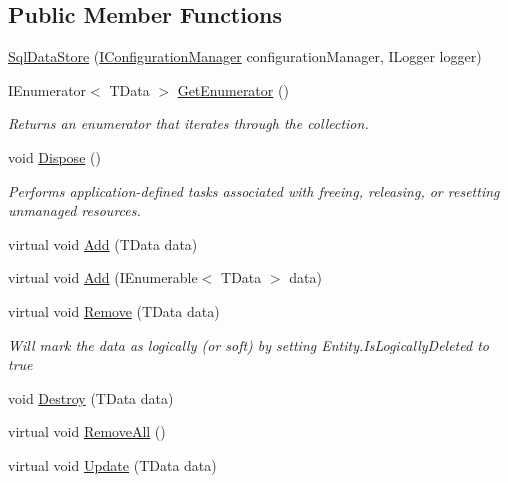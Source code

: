\subsection*{Public Member Functions}
\begin{DoxyCompactItemize}
\item 
\hyperlink{classCqrs_1_1DataStores_1_1SqlDataStore_a0ce9b3f74799e463d4f53eda386d5577}{Sql\+Data\+Store} (\hyperlink{interfaceCqrs_1_1Configuration_1_1IConfigurationManager}{I\+Configuration\+Manager} configuration\+Manager, I\+Logger logger)
\item 
I\+Enumerator$<$ T\+Data $>$ \hyperlink{classCqrs_1_1DataStores_1_1SqlDataStore_a774a0a12d6a89479cf25191916f51c47}{Get\+Enumerator} ()
\begin{DoxyCompactList}\small\item\em Returns an enumerator that iterates through the collection. \end{DoxyCompactList}\item 
void \hyperlink{classCqrs_1_1DataStores_1_1SqlDataStore_a975c0087677987dffccc4f0ffa97e691}{Dispose} ()
\begin{DoxyCompactList}\small\item\em Performs application-\/defined tasks associated with freeing, releasing, or resetting unmanaged resources. \end{DoxyCompactList}\item 
virtual void \hyperlink{classCqrs_1_1DataStores_1_1SqlDataStore_abcca53d2e93dbdfb193a9fb0996849c5}{Add} (T\+Data data)
\item 
virtual void \hyperlink{classCqrs_1_1DataStores_1_1SqlDataStore_a45aa105f2571510223c6073804690487}{Add} (I\+Enumerable$<$ T\+Data $>$ data)
\item 
virtual void \hyperlink{classCqrs_1_1DataStores_1_1SqlDataStore_a898d15db199f054865a96ac646bf54fb}{Remove} (T\+Data data)
\begin{DoxyCompactList}\small\item\em Will mark the {\itshape data}  as logically (or soft) by setting Entity.\+Is\+Logically\+Deleted to true \end{DoxyCompactList}\item 
void \hyperlink{classCqrs_1_1DataStores_1_1SqlDataStore_a5ec396c9eb202c8de931c1546c721ca3}{Destroy} (T\+Data data)
\item 
virtual void \hyperlink{classCqrs_1_1DataStores_1_1SqlDataStore_abb88337dccf3d5372f6b0920d5d26ebd}{Remove\+All} ()
\item 
virtual void \hyperlink{classCqrs_1_1DataStores_1_1SqlDataStore_a8f85191cecef92d003620d4064584bb2}{Update} (T\+Data data)
\end{DoxyCompactItemize}
